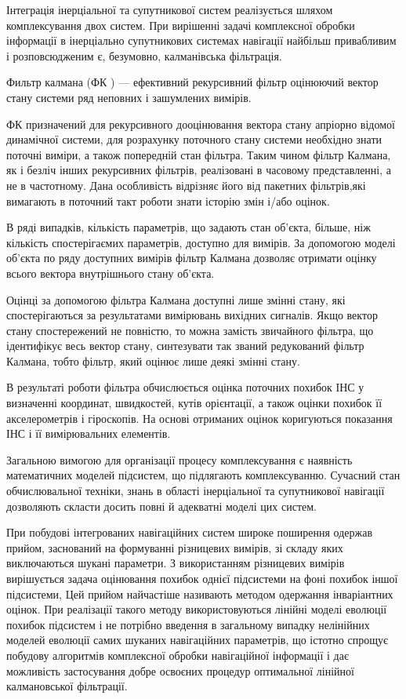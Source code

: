 Інтеграція інерціальної та супутникової систем реалізується шляхом комплексування двох
систем. При вирішенні задачі комплексної обробки інформації в інерціально супутникових
системах навігації найбільш привабливим і розповсюдженим є, безумовно, калманівська 
фільтрація.

Фильтр калмана (ФК ) --- ефективний рекурсивний фільтр оцінюючий вектор стану системи
ряд неповних і зашумлених вимірів.

ФК призначений для рекурсивного дооцінювання вектора стану апріорно відомої динамічної
системи, для розрахунку поточного стану системи необхідно знати поточні виміри, а
також попередній стан фільтра. Таким чином фільтр Калмана, як і безліч інших
рекурсивних фільтрів, реалізовані в часовому представленні, а не в частотному.
Дана особливість відрізняє його від пакетних фільтрів,які вимагають в поточний
такт роботи знати історію змін і/або оцінок.

В ряді випадків, кількість параметрів, що задають стан об'єкта, більше, ніж кількість
спостерігаємих параметрів, доступно для вимірів. За допомогою моделі об'єкта
по ряду доступних вимірів фільтр Калмана дозволяє отримати оцінку всього вектора
внутрішнього стану об'єкта. 


Оцінці за допомогою фільтра Калмана доступні лише змінні стану, які спостерігаються 
за результатами вимірювань вихідних сигналів. Якщо вектор стану спостережений не 
повністю, то можна замість звичайного фільтра, що ідентифікує весь вектор стану, 
синтезувати так званий редукований фільтр Калмана, тобто фільтр, який оцінює лише 
деякі змінні стану.

В результаті роботи фільтра обчислюється оцінка поточних похибок ІНС 
у визначенні координат, швидкостей, кутів орієнтації, а також оцінки 
похибок її акселерометрів і гіроскопів. На основі отриманих оцінок 
коригуються показання ІНС і її вимірювальних елементів.

Загальною вимогою для організації процесу комплексування є наявність 
математичних моделей підсистем, що підлягають комплексуванню. Сучасний 
стан обчислювальної техніки, знань в області інерціальної та супутникової 
навігації дозволяють скласти досить повні й адекватні моделі цих систем.

При побудові інтегрованих  навігаційних систем широке поширення одержав 
прийом, заснований на формуванні різницевих вимірів, зі складу яких 
виключаються шукані параметри. З використанням різницевих вимірів  
вирішується задача оцінювання похибок однієї підсистеми на фоні 
похибок іншої підсистеми, Цей прийом  найчастіше називають методом 
одержання інваріантних оцінок. При реалізації такого методу 
використовуються лінійні моделі еволюції похибок підсистем  
і не потрібно введення в загальному випадку нелінійних моделей еволюції 
самих шуканих навігаційних параметрів, що істотно спрощує побудову 
алгоритмів комплексної обробки навігаційної інформації і дає можливість 
застосування добре освоєних процедур оптимальної  лінійної 
калмановської фільтрації.

